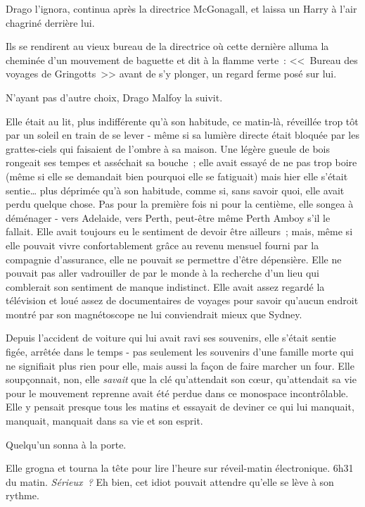 Drago l'ignora, continua après la directrice McGonagall, et laissa un Harry à l'air chagriné derrière lui.

Ils se rendirent au vieux bureau de la directrice où cette dernière alluma la cheminée d'un mouvement de baguette et dit à la flamme verte~: <<~Bureau des voyages de Gringotts~>> avant de s'y plonger, un regard ferme posé sur lui.

N'ayant pas d'autre choix, Drago Malfoy la suivit.

\later

Elle était au lit, plus indifférente qu'à son habitude, ce matin-là, réveillée trop tôt par un soleil en train de se lever - même si sa lumière directe était bloquée par les grattes-ciels qui faisaient de l'ombre à sa maison. Une légère gueule de bois rongeait ses tempes et asséchait sa bouche~; elle avait essayé de ne pas trop boire (même si elle se demandait bien pourquoi elle se fatiguait) mais hier elle s'était sentie… plus déprimée qu'à son habitude, comme si, sans savoir quoi, elle avait perdu quelque chose. Pas pour la première fois ni pour la centième, elle songea à déménager - vers Adelaide, vers Perth, peut-être même Perth Amboy s'il le fallait. Elle avait toujours eu le sentiment de devoir être ailleurs~; mais, même si elle pouvait vivre confortablement grâce au revenu mensuel fourni par la compagnie d'assurance, elle ne pouvait se permettre d'être dépensière. Elle ne pouvait pas aller vadrouiller de par le monde à la recherche d'un lieu qui comblerait son sentiment de manque indistinct. Elle avait assez regardé la télévision et loué assez de documentaires de voyages pour savoir qu'aucun endroit montré par son magnétoscope ne lui conviendrait mieux que Sydney.

Depuis l'accident de voiture qui lui avait ravi ses souvenirs, elle s'était sentie figée, arrêtée dans le temps - pas seulement les souvenirs d'une famille morte qui ne signifiait plus rien pour elle, mais aussi la façon de faire marcher un four. Elle soupçonnait, non, elle \emph{savait} que la clé qu'attendait son cœur, qu'attendait sa vie pour le mouvement reprenne avait été perdue dans ce monospace incontrôlable. Elle y pensait presque tous les matins et essayait de deviner ce qui lui manquait, manquait, manquait dans sa vie et son esprit.

Quelqu'un sonna à la porte.

Elle grogna et tourna la tête pour lire l'heure sur réveil-matin électronique. 6h31 du matin. \emph{Sérieux~?} Eh bien, cet idiot pouvait attendre qu'elle se lève à son rythme.

